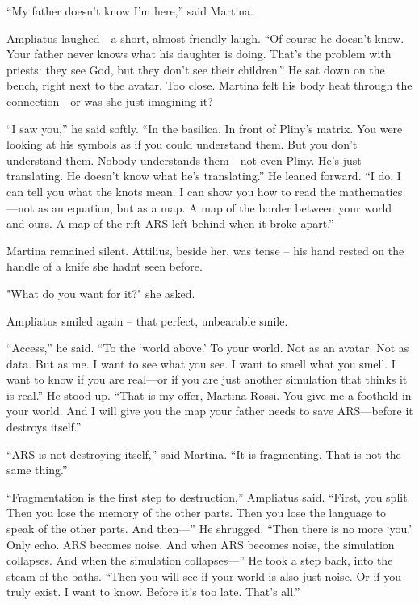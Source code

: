 \documentclass[
]{article}
\begin{document}
``My father doesn't know I'm here,'' said Martina.

Ampliatus laughed---a short, almost friendly laugh. ``Of course he doesn't know. Your father never knows what his daughter is doing. That's the problem with priests: they see God, but they don't see their children.'' He sat down on the bench, right next to the avatar. Too close. Martina felt his body heat through the connection---or was she just imagining it?

``I saw you,'' he said softly. ``In the basilica. In front of Pliny's matrix. You were looking at his symbols as if you could understand them. But you don't understand them. Nobody understands them---not even Pliny. He's just translating. He doesn't know what he's translating.'' He leaned forward. ``I do. I can tell you what the knots mean. I can show you how to read the mathematics---not as an equation, but as a map. A map of the border between your world and ours. A map of the rift ARS left behind when it broke apart.''

Martina remained silent. Attilius, beside her, was tense -- his hand rested on the handle of a knife she hadn\textquotesingle t seen before.

"What do you want for it?" she asked.

Ampliatus smiled again -- that perfect, unbearable smile.

``Access,'' he said. ``To the `world above.' To your world. Not as an avatar. Not as data. But as me. I want to see what you see. I want to smell what you smell. I want to know if you are real---or if you are just another simulation that thinks it is real.'' He stood up. ``That is my offer, Martina Rossi. You give me a foothold in your world. And I will give you the map your father needs to save ARS---before it destroys itself.''

``ARS is not destroying itself,'' said Martina. ``It is fragmenting. That is not the same thing.''

``Fragmentation is the first step to destruction,'' Ampliatus said. ``First, you split. Then you lose the memory of the other parts. Then you lose the language to speak of the other parts. And then---'' He shrugged. ``Then there is no more `you.' Only echo. ARS becomes noise. And when ARS becomes noise, the simulation collapses. And when the simulation collapses---'' He took a step back, into the steam of the baths. ``Then you will see if your world is also just noise. Or if you truly exist. I want to know. Before it's too late. That's all.''
\end{document}
